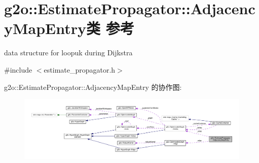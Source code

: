 \hypertarget{classg2o_1_1EstimatePropagator_1_1AdjacencyMapEntry}{\section{g2o\-:\-:Estimate\-Propagator\-:\-:Adjacency\-Map\-Entry类 参考}
\label{classg2o_1_1EstimatePropagator_1_1AdjacencyMapEntry}
}


data structure for loopuk during Dijkstra  




{\ttfamily \#include $<$estimate\-\_\-propagator.\-h$>$}



g2o\-:\-:Estimate\-Propagator\-:\-:Adjacency\-Map\-Entry 的协作图\-:
\nopagebreak
\begin{figure}[H]
\begin{center}
\leavevmode
\includegraphics[width=350pt]{classg2o_1_1EstimatePropagator_1_1AdjacencyMapEntry__coll__graph}
\end{center}
\end{figure}

